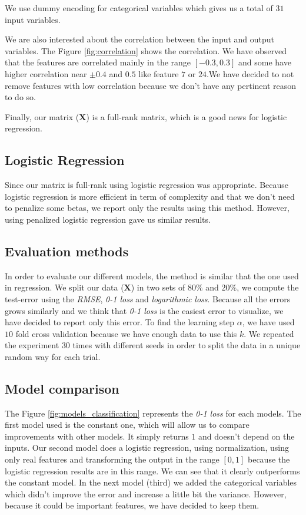 \documentclass{article} %
\begin{document}
We use dummy encoding for categorical variables which gives us a total of $31$ input variables.

We are also interested about the correlation between the input and output variables. The Figure \ref{fig:correlation} shows the correlation. We have observed that the features are correlated mainly in the range $[-0.3,0.3]$ and some have higher correlation near $\pm0.4$ and $0.5$ like feature $7$ or $24$.We have decided to not remove features with low correlation because we don't have any pertinent reason to do so.

Finally, our matrix ($\mathbf{X}$) is a full-rank matrix, which is a good news for logistic regression.

\subsection{Logistic Regression}

Since our matrix is full-rank using logistic regression was appropriate. Because logistic regression is more efficient in term of complexity and that we don't need to penalize some betas, we report only the results using this method. However, using penalized logistic regression gave us similar results.

\subsection{Evaluation methods}

In order to evaluate our different models, the method is similar that the one used in regression. We split our data ($\mathbf{X}$) in two sets of $80\%$ and $20\%$, we compute the test-error using the \textit{RMSE}, \textit{0-1 loss} and \textit{logarithmic loss}. Because all the errors grows similarly and we think that \textit{0-1 loss} is the easiest error to visualize, we have decided to report only this error. To find the learning step $\alpha$, we have used $10$ fold cross validation because we have enough data to use this $k$. We repeated the experiment $30$ times with different seeds in order to split the data in a unique random way for each trial.

\subsection{Model comparison}

The Figure \ref{fig:models_classification} represents the \textit{0-1 loss} for each models. The first model used is the constant one, which will allow us to compare improvements with other models. It simply returns $1$ and doesn't depend on the inputs. Our second model does a logistic regression, using normalization, using only real features and transforming the output in the range $[0,1]$ because the logistic regression results are in this range. We can see that it clearly outperforms the constant model. In the next model (third) we added the categorical variables which didn't improve the error and increase a little bit the variance. However, because it could be important features, we have decided to keep them.
\end{document}
